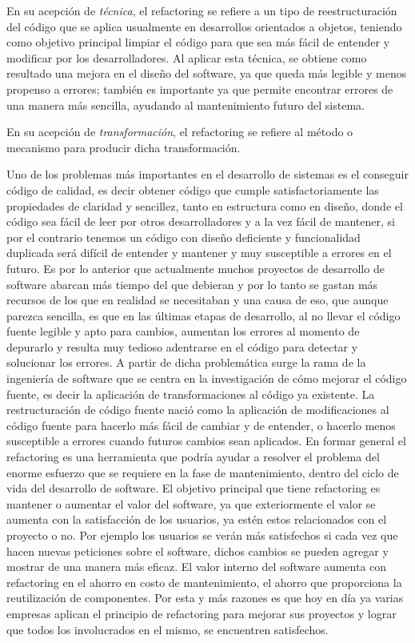 \documentclass{article}
\begin{document}
En su acepción de \textit{técnica}, el refactoring se refiere a un tipo de reestructuración del código 
que se aplica usualmente en desarrollos orientados a objetos, teniendo como objetivo principal 
limpiar el código para que sea más fácil de entender y modificar por los desarrolladores. Al aplicar 
esta técnica, se obtiene como resultado una mejora en el diseño del software, ya que queda más legible
y menos propenso a errores; también es importante ya que permite encontrar errores de una manera más 
sencilla, ayudando al mantenimiento futuro del sistema.

En su acepción de \textit{transformación}, el refactoring se refiere al método o mecanismo para producir
dicha transformación.

\hrulefill{}

Uno de los problemas más importantes en el desarrollo de sistemas es el conseguir código de calidad, es decir obtener código que cumple satisfactoriamente las propiedades de claridad y sencillez, tanto en estructura como en diseño, donde el código sea fácil de leer por otros desarrolladores y a la vez fácil de mantener, si por el contrario tenemos un código con diseño deficiente y funcionalidad duplicada será difícil de entender y mantener y muy susceptible a errores en el futuro. 
Es por lo anterior que actualmente muchos proyectos de desarrollo de software abarcan más tiempo del que debieran y por lo tanto se gastan más recursos de los que en realidad se necesitaban y una causa de eso, que aunque parezca sencilla, es que en las últimas etapas de desarrollo, al no llevar el código fuente legible y apto para cambios, aumentan los errores al momento de depurarlo y resulta muy tedioso adentrarse en el código para detectar y solucionar los errores. A partir de dicha problemática surge la rama de la ingeniería de software que se centra en la investigación de cómo mejorar el código fuente, es decir la aplicación de transformaciones al código ya existente. La restructuración de código fuente nació como la aplicación de modificaciones al código fuente para hacerlo más fácil de cambiar y de entender, o hacerlo menos susceptible a errores cuando futuros cambios sean aplicados. En formar general el refactoring es una herramienta que podría ayudar a resolver el problema del enorme esfuerzo que se requiere en la fase de mantenimiento, dentro del ciclo de vida del desarrollo de software.
El objetivo principal que tiene refactoring es mantener o aumentar el valor del software, ya que exteriormente el valor se aumenta con la satisfacción de los usuarios, ya estén estos relacionados con el proyecto o no. Por ejemplo los usuarios se verán más satisfechos si cada vez que hacen nuevas peticiones sobre el software, dichos cambios se pueden agregar y mostrar de una manera más eficaz. El valor interno del software aumenta con refactoring en el ahorro en costo de mantenimiento, el ahorro que proporciona la reutilización de componentes.
Por esta y más razones es que hoy en día ya varias empresas aplican el principio de refactoring para mejorar sus proyectos y lograr que todos los involucrados en el mismo, se encuentren satisfechos.
\end{document}
